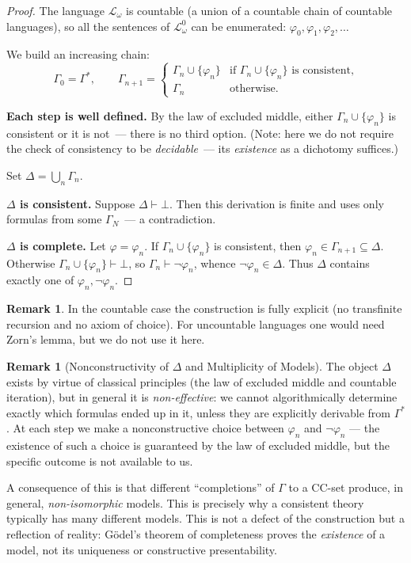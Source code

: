 \documentclass[12pt, a4paper]{article}
\theoremstyle{plain}
\theoremstyle{definition}
\newtheorem{remark}[theorem]{Remark}
\newcommand{\proves}{\vdash}
\newcommand{\Lw}{\mathcal{L}_\omega}
\begin{document}
\begin{proof}
The language $\Lw$ is countable (a union of a countable chain of countable languages),
so all the sentences of $\Lw^0$ can be enumerated:
$\varphi_0, \varphi_1, \varphi_2, \ldots$

We build an increasing chain:
\[
  \Gamma_0 = \Gamma^*, \qquad
  \Gamma_{n+1} =
  \begin{cases}
    \Gamma_n \cup \{\varphi_n\} & \text{if } \Gamma_n \cup \{\varphi_n\}
    \text{ is consistent,}\\
    \Gamma_n & \text{otherwise.}
  \end{cases}
\]

\textbf{Each step is well defined.}
By the law of excluded middle, either $\Gamma_n \cup \{\varphi_n\}$
is consistent or it is not~--- there is no third option.
(Note: here we do not require the check of consistency to be
\emph{decidable}~--- its \emph{existence} as a dichotomy suffices.)

Set $\Delta = \bigcup_{n} \Gamma_n$.

\textbf{$\Delta$ is consistent.}
Suppose $\Delta \proves \bot$. Then this derivation is finite and uses
only formulas from some $\Gamma_N$~--- a contradiction.

\textbf{$\Delta$ is complete.}
Let $\varphi = \varphi_n$. If $\Gamma_n \cup \{\varphi_n\}$ is consistent,
then $\varphi_n \in \Gamma_{n+1} \subseteq \Delta$.
Otherwise $\Gamma_n \cup \{\varphi_n\} \proves \bot$, so $\Gamma_n \proves \neg\varphi_n$,
whence $\neg\varphi_n \in \Delta$.
Thus $\Delta$ contains exactly one of $\varphi_n, \neg\varphi_n$.
\end{proof}

\begin{remark}
In the countable case the construction is fully explicit (no transfinite
recursion and no axiom of choice). For uncountable languages one would need
Zorn's lemma, but we do not use it here.
\end{remark}

\begin{remark}[Nonconstructivity of $\Delta$ and Multiplicity of Models]
The object $\Delta$ exists by virtue of classical principles (the law of
excluded middle and countable iteration), but in general it is \emph{non-effective}:
we cannot algorithmically determine exactly which formulas
ended up in it, unless they are explicitly derivable
from $\Gamma^*$. At each step we make a nonconstructive choice between
$\varphi_n$ and $\neg\varphi_n$ --- the existence of such a choice is guaranteed
by the law of excluded middle, but the specific outcome is not available to us.

A consequence of this is that different ``completions'' of $\Gamma$ to a
CC-set produce, in general, \emph{non-isomorphic} models. This is precisely why
a consistent theory typically has many different models.
This is not a defect of the construction but a reflection of reality: G\"odel's theorem
of completeness proves the \emph{existence} of a model, not its
uniqueness or constructive presentability.
\end{remark}
\end{document}
